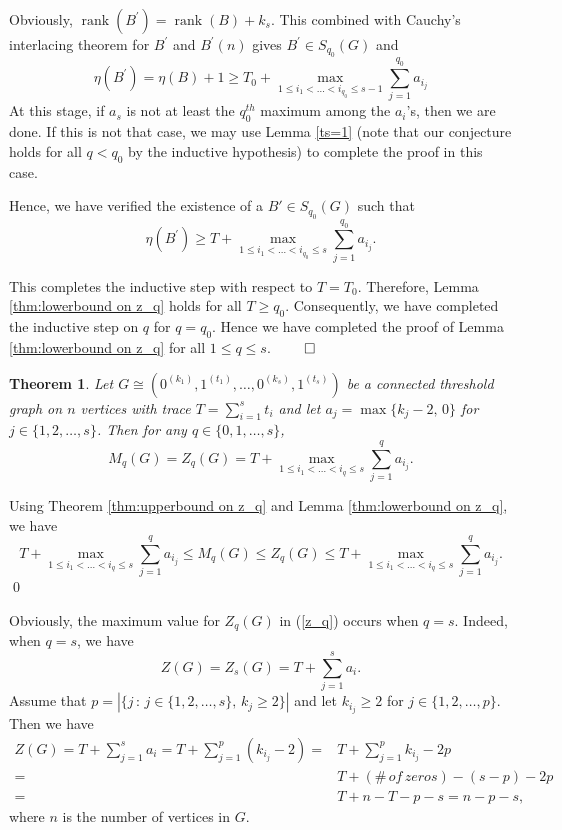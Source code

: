 \documentclass[3p,times,12pt]{article}
\newtheorem{theorem}{Theorem}[section]
\newenvironment{pf}{\medskip {Proof:  \hspace*{-.4cm}}
    \enspace}{\hfill \qed \newline \medskip}
\DeclareMathOperator{\rank}{rank}
\begin{document}
Obviously, $\rank(B^{\prime})=\rank(B)+k_s$. This combined with Cauchy's interlacing theorem for $B^{\prime}$ and $B^{\prime}(n)$ gives $B^{\prime}\in S_{q_0}(G)$ and
 \begin{equation}\nonumber
\eta(B^{\prime})=\eta(B)+1\ge T_0+\max_{1 \le i_1<\ldots<i_{q_0} \le s-1} \sum_{j=1}^{q_0} a_{i_j} 
 \end{equation} 
 At this stage, if $a_s$ is not at least the $q_0^{th}$ maximum among the $a_i$'s, then we are done. If this is not that case, we may use Lemma \ref{ts=1} (note that our conjecture holds for all $q<q_0$ by the inductive hypothesis) to complete the proof in this case.
 
 Hence, we have verified the existence of a $B' \in S_{q_0}(G)$ such that 
 \begin{equation}\label{}
 \eta(B^{\prime})\ge T+\max_{1 \le i_1<\ldots<i_{q_0} \le s} \sum_{j=1}^{q_0} a_{i_j}.
 \end{equation}

This completes the inductive step with respect to $T=T_0$. Therefore, Lemma \ref{thm:lowerbound on z_q} holds for all $T \geq q_0$. Consequently, we have completed the inductive step on $q$ for $q=q_0$. Hence we have completed the proof of Lemma \ref{thm:lowerbound on z_q} for all $1 \leq q \leq s$.  
\newline \hspace*{13cm} $\qed$


\begin{theorem}\label{m_q=z_q}
 Let $G\cong (0^{(k_1)}, 1^{(t_1)}, \ldots,0^{(k_s)}, 1^{(t_s)})$ be a connected threshold graph on $n$ vertices with trace $T=\sum_{i=1}^s t_i$ and let $a_j=\max\{k_j-2,\,0\}$ for $j\in \{1,2,\ldots,s\}$. Then for any $q\in \{0,1,\ldots,s\}$, 
 \begin{equation}\label{m-z_q}
 M_q(G)=Z_q(G)= T+\max_{1 \le i_1<\ldots<i_q \le s} \sum_{j=1}^q a_{i_j}.
 \end{equation}
 \end{theorem}

\begin{pf}
Using Theorem \ref{thm:upperbound on z_q} and Lemma \ref{thm:lowerbound on z_q}, we have 
\[ T+\max_{1 \le i_1<\ldots<i_q \le s} \sum_{j=1}^q a_{i_j} \leq M_q(G) \leq Z_q(G) \leq T+\max_{1 \le i_1<\ldots<i_q \le s} \sum_{j=1}^q a_{i_j}.\]
\end{pf}

 Obviously, the maximum value for $Z_q(G)$ in (\ref{z_q}) occurs when $q=s$. Indeed, when $q=s$, we have $$Z(G)=Z_s(G)=T+\sum_{j=1}^s a_{i}.$$ Assume that $p=|\{j\,:\, j\in \{1,2,\ldots, s\},\,k_j\ge 2\}|$ and let $k_{i_j}\ge 2$ for $j\in \{1,2,\ldots,p\}$. Then we have 
\begin{align}
Z(G)= T+\sum_{j=1}^s a_{i}=T+\sum_{j=1}^p (k_{i_j}-2)=& T+\sum_{j=1}^p k_{i_j}-2p \nonumber\\
 =& T+(\#\, of\, zeros) -(s-p)-2p \nonumber\\
 =& T+n-T-p-s=n-p-s,  \nonumber
\end{align} where $n$ is the number of vertices in $G$.
\end{document}
